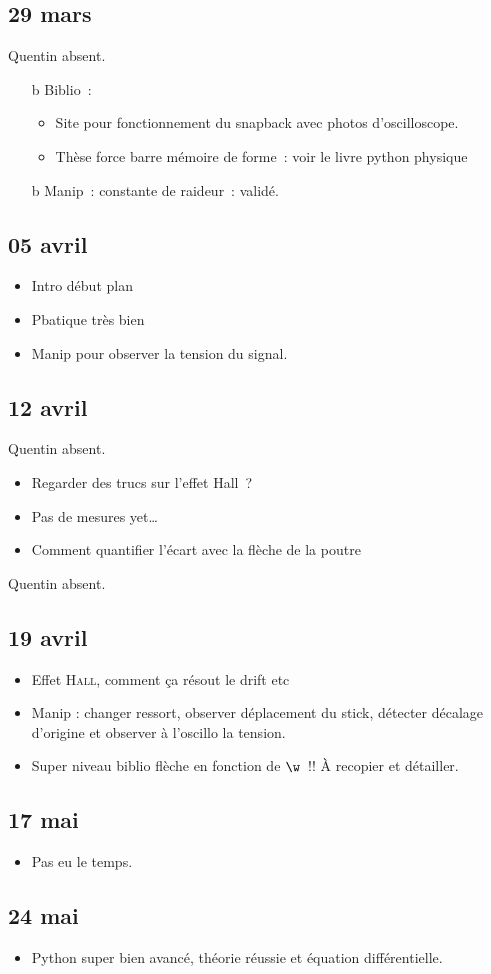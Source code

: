 \documentclass[a4paper, 11pt, final, garamond]{book}
\begin{document}
\subsection{29 mars}
Quentin absent.
\begin{itemize}
	\item[b]{Biblio}~:
	\begin{itemize}
		\item Site pour fonctionnement du snapback avec photos
		      d'oscilloscope.
		\item Thèse force barre mémoire de forme~: voir le livre python physique
	\end{itemize}
	\item[b]{Manip}~: constante de raideur~: validé.
\end{itemize}

\subsection{05 avril}
\begin{itemize}
	\item Intro début plan
	\item Pbatique très bien
	\item Manip pour observer la tension du signal.
\end{itemize}

\subsection{12 avril}
Quentin absent.
\begin{itemize}
	\item Regarder des trucs sur l'effet Hall~?
	\item Pas de mesures yet…
	\item Comment quantifier l'écart avec la flèche de la poutre
\end{itemize}

Quentin absent.
\subsection{19 avril}
\begin{itemize}
	\item Effet \textsc{Hall}, comment ça résout le drift etc
	\item Manip : changer ressort, observer déplacement du stick, détecter
	      décalage d'origine et observer à l'oscillo la tension.
	\item Super niveau biblio flèche en fonction de $\w$~!! À recopier et
	      détailler.
\end{itemize}

\subsection{17 mai}
\begin{itemize}
	\item Pas eu le temps.
\end{itemize}

\subsection{24 mai}
\begin{itemize}
	\item Python super bien avancé, théorie réussie et équation différentielle.
\end{itemize}
\end{document}
